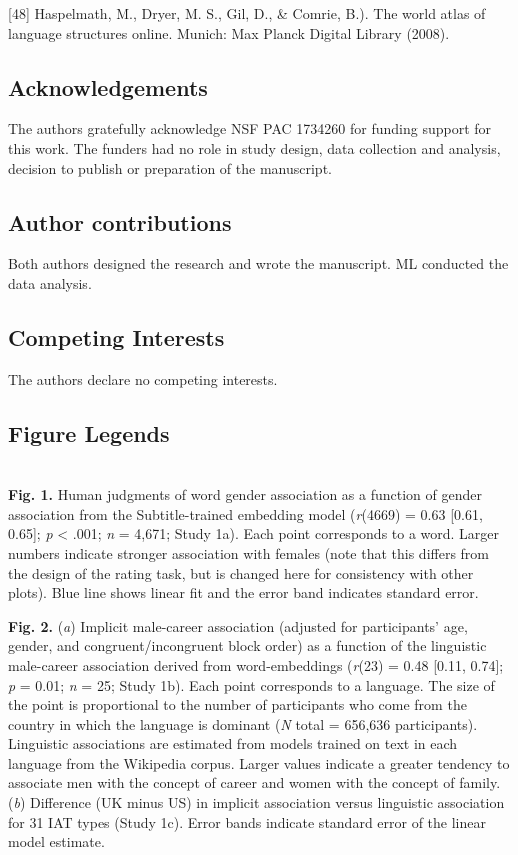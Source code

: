 \documentclass[9pt,twocolumn]{pnas-new}
\begin{document}
[48] Haspelmath, M., Dryer, M. S., Gil, D., \& Comrie, B.). The world atlas of language structures online. Munich: Max Planck Digital Library (2008).


\subsection*{Acknowledgements}

The authors gratefully acknowledge NSF PAC 1734260 for funding support for this work. The funders had no role in study design, data collection and analysis, decision to publish or preparation of the manuscript.

\subsection*{Author contributions}

Both authors designed the research and wrote the manuscript. ML conducted the data analysis.

\subsection*{Competing Interests}
The authors declare no competing interests.

\subsection*{Figure Legends} ~\\


{\bf Fig. 1.} Human judgments of word gender association as
a function of gender association from the Subtitle-trained embedding model
(\emph{r}(4669) = 0.63 {[}0.61, 0.65{]}; \emph{p} \textless{} .001; {\emph n} = 4,671; Study 1a). Each point corresponds to a word. Larger numbers indicate
stronger association with females (note that this differs from the
design of the rating task, but is changed here for consistency with
other plots). Blue line shows linear fit and the error band indicates
standard error.


 {\bf Fig. 2.} ({\it a})  Implicit male-career association (adjusted for participants' age, gender, and congruent/incongruent block order) as a function of the linguistic male-career association derived from word-embeddings (\emph{r}(23) = 0.48 {[}0.11, 0.74{]}; \emph{p} = 0.01; \emph{n} = 25; Study 1b). Each point corresponds to a language. The size of the point is proportional to the number of participants who come from the country in which the language is dominant ({\it N} total = 656,636 participants). Linguistic associations are estimated from models trained on text in each language from the Wikipedia corpus. Larger values indicate a greater tendency to associate men with the concept of career and women with the concept of family. ({\it b}) Difference (UK minus US) in implicit association versus linguistic association for 31 IAT types (Study 1c). Error bands indicate standard error of the linear model
estimate.
\end{document}
